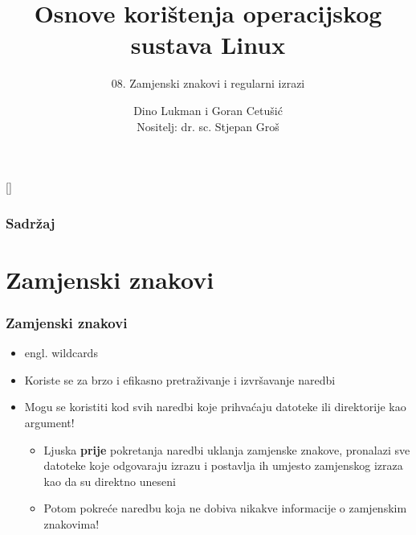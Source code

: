 \documentclass[table,usenames,dvipsnames]{beamer}
\title{Osnove korištenja operacijskog sustava Linux}
\subtitle{08. Zamjenski znakovi i regularni izrazi}
\author[Dino Lukman i Goran Cetušić]{Dino Lukman i Goran Cetušić\\{\small Nositelj: dr. sc. Stjepan Groš}}
\institute[FER]{Sveučilište u Zagrebu \\
				Fakultet elektrotehnike i računarstva}
\date{\todayiso}
\begin{document}
{
[] %

\begin{frame}
\maketitle
\end{frame}
}

\begin{frame}
\frametitle{Sadržaj}
\tableofcontents
\end{frame}

\section{Zamjenski znakovi}
\begin{frame}[t]
\frametitle{Zamjenski znakovi}
\begin{itemize}
  \item engl. wildcards
  \item Koriste se za brzo i efikasno pretraživanje i izvršavanje naredbi
\end{itemize}
\begin{itemize}
	\item Mogu se koristiti kod svih naredbi koje 
	prihvaćaju datoteke ili direktorije kao argument!
	\begin{itemize}
		\item Ljuska \textbf{prije} pokretanja naredbi uklanja zamjenske znakove, pronalazi sve datoteke koje odgovaraju izrazu i postavlja ih umjesto zamjenskog izraza kao da su direktno uneseni
		\item Potom pokreće naredbu koja ne dobiva nikakve informacije o zamjenskim znakovima!
	\end{itemize}
\end{itemize}
\end{frame}
\end{document}
